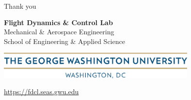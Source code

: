 
\begin{frame}[c]{Thank you}
  \centering
  
  \textbf{\large Flight Dynamics \& Control Lab} \\
  Mechanical \& Aerospace Engineering \\
  School of Engineering \& Applied Science
  
  \begin{center} %
      \includegraphics[width=0.75\textwidth]{figures/defense/gw_txh_2cs_pos}
    \end{center}
  
  \url{https://fdcl.seas.gwu.edu}
\end{frame}
